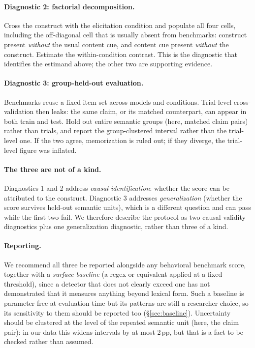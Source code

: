 \paragraph{Diagnostic 2: factorial decomposition.} Cross the construct with the elicitation condition and populate all four cells, including the off-diagonal cell that is usually absent from benchmarks: construct present \emph{without} the usual content cue, and content cue present \emph{without} the construct. Estimate the within-condition contrast. This is the diagnostic that identifies the estimand above; the other two are supporting evidence.

\paragraph{Diagnostic 3: group-held-out evaluation.} Benchmarks reuse a fixed item set across models and conditions. Trial-level cross-validation then leaks: the same claim, or its matched counterpart, can appear in both train and test. Hold out entire semantic groups (here, matched claim pairs) rather than trials, and report the group-clustered interval rather than the trial-level one. If the two agree, memorization is ruled out; if they diverge, the trial-level figure was inflated.

\paragraph{The three are not of a kind.} Diagnostics 1 and 2 address \emph{causal identification}: whether the score can be attributed to the construct. Diagnostic 3 addresses \emph{generalization} (whether the score survives held-out semantic units), which is a different question and can pass while the first two fail. We therefore describe the protocol as two causal-validity diagnostics plus one generalization diagnostic, rather than three of a kind.

\paragraph{Reporting.} We recommend all three be reported alongside any behavioral benchmark score, together with a \emph{surface baseline} (a regex or equivalent applied at a fixed threshold), since a detector that does not clearly exceed one has not demonstrated that it measures anything beyond lexical form. Such a baseline is parameter-free at evaluation time but its patterns are still a researcher choice, so its sensitivity to them should be reported too (§\ref{sec:baseline}). Uncertainty should be clustered at the level of the repeated semantic unit (here, the claim pair): in our data this widens intervals by at most 2\,pp, but that is a fact to be checked rather than assumed.

